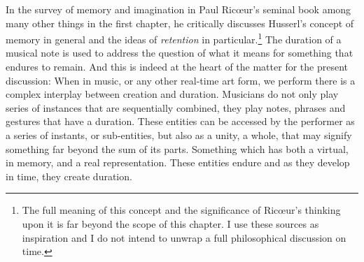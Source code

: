 In the survey of memory and imagination in Paul Ric{\oe}ur's seminal book  among many other things in the first chapter, he critically discusses Husserl's concept of memory in general and the ideas of \emph{retention} in particular.\footnote{The full meaning of this concept and the significance of Ric{\oe}ur's thinking upon it is far beyond the scope of this chapter. I use these sources as inspiration and I do not intend to unwrap a full philosophical discussion on time.} The duration of a musical note is used to address the question of what it means for something that endures to remain. And this is indeed at the heart of the matter for the present discussion: When in music, or any other real-time art form, we perform there is a complex interplay between creation and duration. Musicians do not only play series of instances that are sequentially combined, they play notes, phrases and gestures that have a duration. These entities can be accessed by the performer as a series of instants, or sub-entities, but also as a unity, a whole, that may signify something far beyond the sum of its parts. Something which has both a virtual, in memory, and a real representation. These entities endure and as they develop in time, they create duration.

